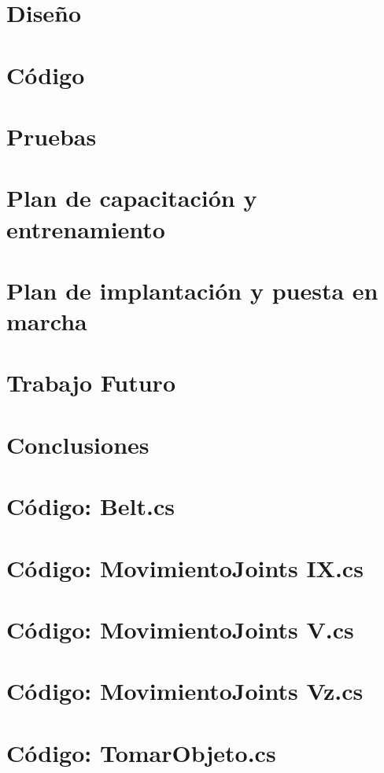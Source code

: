 \documentclass[final,letterpaper,oneside,authoryear,11pt,singlespace,spanish]{ezthesis}
\begin{document}
\chapter{Diseño} 
\chapter{Código} 
\chapter{Pruebas} 
\chapter{Plan de capacitación y entrenamiento} 
\chapter{Plan de implantación y puesta en marcha} 
\chapter{Trabajo Futuro} 
\chapter{Conclusiones} 



\appendix
\chapter{Código: Belt.cs} 
\chapter{Código: MovimientoJoints IX.cs} 
\chapter{Código: MovimientoJoints V.cs} 
\chapter{Código: MovimientoJoints Vz.cs} 
\chapter{Código: TomarObjeto.cs} 
\end{document}
